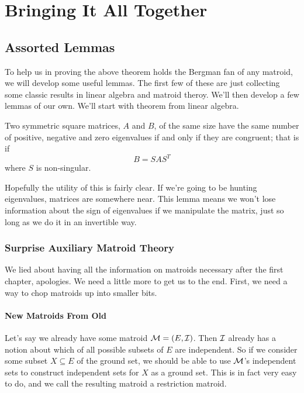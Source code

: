 \documentclass[12pt,oneside]{../../sfsuthesis}
\begin{document}
\chapter{Bringing It All Together}


\section{Assorted Lemmas}

To help us in proving the above theorem holds the Bergman fan of any matroid, we will develop some useful lemmas.
The first few of these are just collecting some classic results in linear algebra and matroid theroy.
We'll then develop a few lemmas of our own.
We'll start with theorem from linear algebra.
\begin{lemma}\th\label{thm:sylvester}
    Two symmetric square matrices, \( A \) and \( B \), of the same size have the same number of positive, negative and zero eigenvalues if and only if they are congruent;
    that is if
    \[
        B = SAS^{T}
    \]
    where \( S \) is non-singular.
\end{lemma}

Hopefully the utility of this is fairly clear.
If we're going to be hunting eigenvalues, matrices are somewhere near.
This lemma means we won't lose information about the sign of eigenvalues if we manipulate the matrix, just so long as we do it in an invertible way.

\subsection{Surprise Auxiliary Matroid Theory}

We lied about having all the information on matroids necessary after the first chapter, apologies.
We need a little more to get us to the end.
First, we need a way to chop matroids up into smaller bits.

\subsubsection{New Matroids From Old}
Let's say we already have some matroid \( \mathcal{M} = (E, \mathcal{I}) \).
Then \( \mathcal{I} \) already has a notion about which of all possible subsets of \( E \) are independent.
So if we consider some subset \( X \subseteq E \) of the ground set, we should be able to use \( \mathcal{M} \)'s independent sets to construct independent sets for \( X \) as a ground set.
This is in fact very easy to do, and we call the resulting matroid a restriction matroid.
\end{document}

